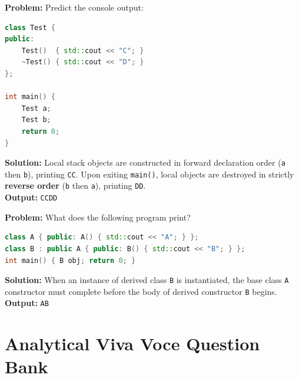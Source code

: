 \begin{tcolorbox}[colback=white,colframe=primary,title=\textbf{Question 9: Constructor and Destructor Destruction Sequencing}]
\textbf{Problem:} Predict the console output:
\begin{lstlisting}[language=C++]
class Test {
public:
    Test()  { std::cout << "C"; }
    ~Test() { std::cout << "D"; }
};

int main() {
    Test a;
    Test b;
    return 0;
}
\end{lstlisting}
\textbf{Solution:} Local stack objects are constructed in forward declaration order (\texttt{a} then \texttt{b}), printing \texttt{CC}. Upon exiting \texttt{main()}, local objects are destroyed in strictly \textbf{reverse order} (\texttt{b} then \texttt{a}), printing \texttt{DD}. \\
\textbf{Output:} \texttt{CCDD}
\end{tcolorbox}

\begin{tcolorbox}[colback=white,colframe=primary,title=\textbf{Question 10: Base and Derived Construction Hierarchy}]
\textbf{Problem:} What does the following program print?
\begin{lstlisting}[language=C++]
class A { public: A() { std::cout << "A"; } };
class B : public A { public: B() { std::cout << "B"; } };
int main() { B obj; return 0; }
\end{lstlisting}
\textbf{Solution:} When an instance of derived class \texttt{B} is instantiated, the base class \texttt{A} constructor must complete before the body of derived constructor \texttt{B} begins. \\
\textbf{Output:} \texttt{AB}
\end{tcolorbox}

\section{Analytical Viva Voce Question Bank}
\label{sec:viva_voce_question_bank}

